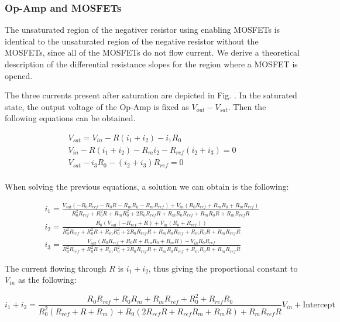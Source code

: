 \documentclass[%
 aip,
amsmath,amssymb,
reprint,
]{revtex4-1}
\begin{document}
\subsubsection{\label{opamp_mosfetiv}Op-Amp and MOSFETs}
The unsaturated region of the negativer resistor using enabling MOSFETs is identical to the unsaturated region of the negative resistor without the MOSFETs, since all of the MOSFETs do not flow current. We derive a theoretical description of the differential resistance slopes for the region where a MOSFET is opened. 

The three currents present after saturation are depicted in Fig. . In the saturated state, the output voltage of the Op-Amp is fixed as $V_{out}-V_{sat}$. Then the following equations can be obtained.


\begin{eqnarray}
  V_{sat} = V_{in}-R(i_1+i_2)-i_1R_0\\
  V_{in} - R(i_1+i_2)-R_mi_2-R_{ref}(i_2+i_3) = 0\\
  V_{sat} -i_3R_0-(i_2+i_3)R_{ref} = 0\\
\end{eqnarray}

When solving the previous equations, a solution we can obtain is the following:
\begin{widetext}
\begin{eqnarray}
  i_1 = \frac{V_{sat}(-R_0R_{ref}-R_0R-R_mR_0-R_mR_{ref})+V_{in}(R_0R_{ref}+R_mR_0+R_mR_{ref})}{R_0^2R_{ref}+R_0^2R+R_mR_0^2+2R_0R_{ref}R+R_mR_0R_{ref}+R_mR_0R+R_mR_{ref}R}\\
  i_2 = \frac{R_0(V_{sat}(-R_{ref}+R)+V_{in}(R_0+R_{ref}))}{R_0^2R_{ref}+R_0^2R+R_mR_0^2+2R_0R_{ref}R+R_mR_0R_{ref}+R_mR_0R+R_mR_{ref}R}\\
  i_3 = \frac{V_{sat}(R_0R_{ref}+R_0R+R_mR_0+R_mR)-V_{in}R_0R_{ref}}{R_0^2R_{ref}+R_0^2R+R_mR_0^2+2R_0R_{ref}R+R_mR_0R_{ref}+R_mR_0R+R_mR_{ref}R}
\end{eqnarray}
\end{widetext}
The current flowing through $R$ is $i_1+i_2$, thus giving the proportional constant to $V_{in}$ as the following:
\begin{widetext}
\begin{equation}
  i_1+i_2 = \frac{R_0R_{ref}+R_0R_m+R_mR_{ref}+R_0^2+R_{ref}R_0}{R_0^2(R_{ref}+R+R_m)+R_0(2R_{ref}R+R_{ref}R_m+R_mR)+R_mR_{ref}R}V_{in} + \text{Intercept}
\end{equation}
\end{widetext}



\end{document}
